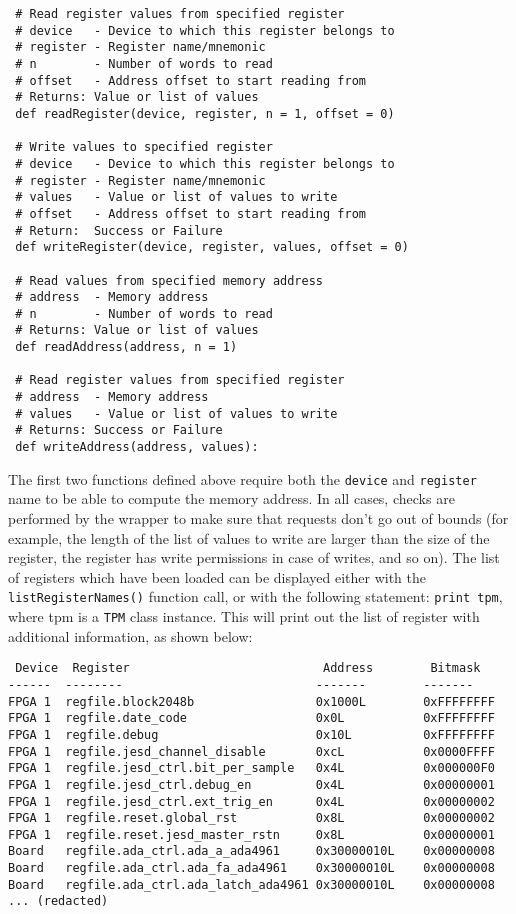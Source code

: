 \documentclass[a4paper,11pt]{article}
\begin{document}
\begin{lstlisting}
 # Read register values from specified register
 # device   - Device to which this register belongs to
 # register - Register name/mnemonic
 # n        - Number of words to read
 # offset   - Address offset to start reading from
 # Returns: Value or list of values
 def readRegister(device, register, n = 1, offset = 0)
 
 # Write values to specified register
 # device   - Device to which this register belongs to
 # register - Register name/mnemonic
 # values   - Value or list of values to write
 # offset   - Address offset to start reading from
 # Return:  Success or Failure
 def writeRegister(device, register, values, offset = 0)
 
 # Read values from specified memory address
 # address  - Memory address
 # n        - Number of words to read
 # Returns: Value or list of values
 def readAddress(address, n = 1)
 
 # Read register values from specified register
 # address  - Memory address
 # values   - Value or list of values to write
 # Returns: Success or Failure
 def writeAddress(address, values):
\end{lstlisting}

The first two functions defined above require both the \texttt{device} and 
\texttt{register} name to be able to compute the memory address. In all cases, 
checks are performed by the wrapper to make sure that requests don't go out of 
bounds (for example, the length of the list of values to write are larger than 
the size of the register, the register has write permissions in case of writes, 
and so on). The list of registers which have been loaded can be displayed either 
with the \texttt{listRegisterNames()} function call, or with the following 
statement: \texttt{print tpm}, where tpm is a \texttt{TPM} class instance. This 
will print out the list of register with additional information, as shown below:

\begin{lstlisting}
 Device  Register                           Address        Bitmask
------  --------                           -------        -------
FPGA 1	regfile.block2048b                 0x1000L        0xFFFFFFFF
FPGA 1	regfile.date_code                  0x0L           0xFFFFFFFF
FPGA 1	regfile.debug                      0x10L          0xFFFFFFFF
FPGA 1	regfile.jesd_channel_disable       0xcL           0x0000FFFF
FPGA 1	regfile.jesd_ctrl.bit_per_sample   0x4L           0x000000F0
FPGA 1	regfile.jesd_ctrl.debug_en         0x4L           0x00000001
FPGA 1	regfile.jesd_ctrl.ext_trig_en      0x4L           0x00000002
FPGA 1	regfile.reset.global_rst           0x8L           0x00000002
FPGA 1	regfile.reset.jesd_master_rstn     0x8L           0x00000001
Board   regfile.ada_ctrl.ada_a_ada4961     0x30000010L    0x00000008
Board   regfile.ada_ctrl.ada_fa_ada4961    0x30000010L    0x00000008
Board   regfile.ada_ctrl.ada_latch_ada4961 0x30000010L    0x00000008
... (redacted)
\end{lstlisting}
\end{document}

